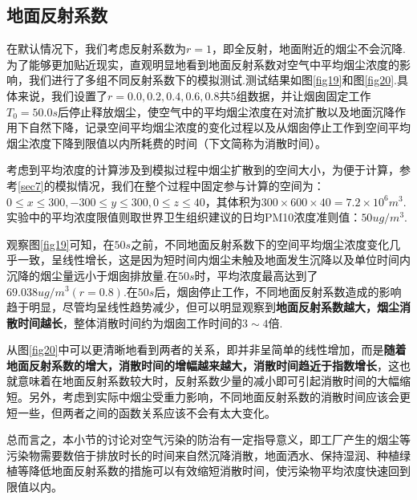\documentclass{article}
\begin{document}
	\subsection{地面反射系数}
	在默认情况下，我们考虑反射系数为$r=1$，即全反射，地面附近的烟尘不会沉降.为了能够更加贴近现实，直观明显地看到地面反射系数对空气中平均烟尘浓度的影响，我们进行了多组不同反射系数下的模拟测试.测试结果如图\ref{fig19}和图\ref{fig20}.具体来说，我们设置了$r=0.0,0.2,0.4,0.6,0.8$共5组数据，并让烟囱固定工作$T_0=50.0s$后停止释放烟尘，使空气中的平均烟尘浓度在对流扩散以及地面沉降作用下自然下降，记录空间平均烟尘浓度的变化过程以及从烟囱停止工作到空间平均烟尘浓度下降到限值以内所耗费的时间（下文简称为消散时间）。
    \par 考虑到平均浓度的计算涉及到模拟过程中烟尘扩散到的空间大小，为便于计算，参考\cref{sec7}的模拟情况，我们在整个过程中固定参与计算的空间为：$0 \le x \le 300, -300 \le y \le 300, 0 \le z \le 40$，其体积为$300 \times 600 \times 40 = 7.2 \times 10^6 m^3$.实验中的平均浓度限值则取世界卫生组织建议的日均PM10浓度准则值：$50ug/m^3$.
    \par 观察图\ref{fig19}可知，在$50s$之前，不同地面反射系数下的空间平均烟尘浓度变化几乎一致，呈线性增长，这是因为短时间内烟尘未触及地面发生沉降以及单位时间内沉降的烟尘量远小于烟囱排放量.在$50s$时，平均浓度最高达到了$69.038ug/m^3(r=0.8)$.在$50s$后，烟囱停止工作，不同地面反射系数造成的影响趋于明显，尽管均呈线性趋势减少，但可以明显观察到\textbf{地面反射系数越大，烟尘消散时间越长}，整体消散时间约为烟囱工作时间的$3\sim4$倍.
    \par 从图\ref{fig20}中可以更清晰地看到两者的关系，即并非呈简单的线性增加，而是\textbf{随着地面反射系数的增大，消散时间的增幅越来越大，消散时间趋近于指数增长}，这也就意味着在地面反射系数较大时，反射系数少量的减小即可引起消散时间的大幅缩短。另外，考虑到实际中烟尘受重力影响，不同地面反射系数的消散时间应该会更短一些，但两者之间的函数关系应该不会有太大变化。
    \par 总而言之，本小节的讨论对空气污染的防治有一定指导意义，即工厂产生的烟尘等污染物需要数倍于排放时长的时间来自然沉降消散，地面洒水、保持湿润、种植绿植等降低地面反射系数的措施可以有效缩短消散时间，使污染物平均浓度快速回到限值以内。
    
\end{document}
